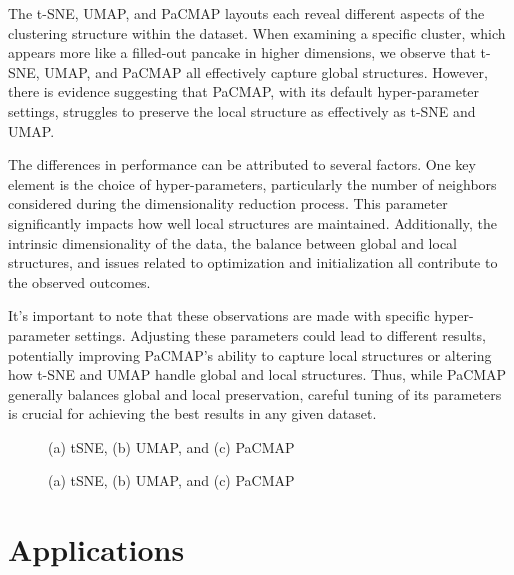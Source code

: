 \documentclass[
  12pt]{article}
\begin{document}
The t-SNE, UMAP, and PaCMAP layouts each reveal different aspects of the
clustering structure within the dataset. When examining a specific
cluster, which appears more like a filled-out pancake in higher
dimensions, we observe that t-SNE, UMAP, and PaCMAP all effectively
capture global structures. However, there is evidence suggesting that
PaCMAP, with its default hyper-parameter settings, struggles to preserve
the local structure as effectively as t-SNE and UMAP.

The differences in performance can be attributed to several factors. One
key element is the choice of hyper-parameters, particularly the number
of neighbors considered during the dimensionality reduction process.
This parameter significantly impacts how well local structures are
maintained. Additionally, the intrinsic dimensionality of the data, the
balance between global and local structures, and issues related to
optimization and initialization all contribute to the observed outcomes.

It's important to note that these observations are made with specific
hyper-parameter settings. Adjusting these parameters could lead to
different results, potentially improving PaCMAP's ability to capture
local structures or altering how t-SNE and UMAP handle global and local
structures. Thus, while PaCMAP generally balances global and local
preservation, careful tuning of its parameters is crucial for achieving
the best results in any given dataset.

\begin{figure}[H]


\caption{\label{fig-five-gau-nldr-layouts}(a) tSNE, (b) UMAP, and (c)
PaCMAP}

\end{figure}%

\begin{figure}[H]


\caption{\label{fig-five-gau-projs}(a) tSNE, (b) UMAP, and (c) PaCMAP}

\end{figure}%

\section{Applications}\label{sec-applications}
\end{document}
